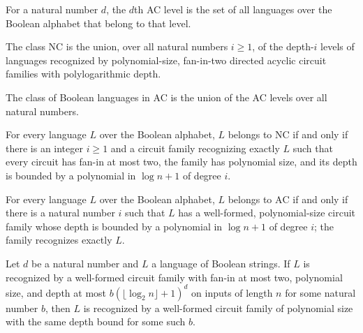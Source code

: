 \begin{definition}
\label{BoolCircuit.ACLevel}
\leanok
{}
For a natural number $d$, the $d$th AC level is the set of all languages over the
Boolean alphabet that belong to that level.
\end{definition}

\begin{definition}
\label{BoolCircuit.NC}
\leanok
{}
The class $\mathrm{NC}$ is the union, over all natural numbers $i\ge 1$, of the
depth-$i$ levels of languages recognized by polynomial-size, fan-in-two directed acyclic
circuit families with polylogarithmic depth.
\end{definition}

\begin{definition}
\label{BoolCircuit.AC}
\leanok
{}
The class of Boolean languages in AC is the union of the AC levels over all natural
numbers.
\end{definition}

\begin{theorem}[Characterization of NC]
\label{BoolCircuit.mem_NC_iff}
\leanok
{}
For every language $L$ over the Boolean alphabet, $L$ belongs to $\mathrm{NC}$ if and
only if there is an integer $i\ge 1$ and a circuit family recognizing exactly $L$ such
that every circuit has fan-in at most two, the family has polynomial size, and its depth
is bounded by a polynomial in $\log n+1$ of degree $i$.
\end{theorem}

\begin{theorem}[Characterization of AC]
\label{BoolCircuit.mem_AC_iff}
\leanok
{}
For every language $L$ over the Boolean alphabet, $L$ belongs to $\mathrm{AC}$ if and
only if there is a natural number $i$ such that $L$ has a well-formed, polynomial-size
circuit family whose depth is bounded by a polynomial in $\log n+1$ of degree $i$; the
family recognizes exactly $L$.
\end{theorem}

\begin{theorem}
\label{Language.InNC.inAC}
\leanok
{}
Let $d$ be a natural number and $L$ a language of Boolean strings. If $L$ is recognized
by a well-formed circuit family with fan-in at most two, polynomial size, and depth at
most $b(\lfloor\log_2 n\rfloor+1)^d$ on inputs of length $n$ for some natural number
$b$, then $L$ is recognized by a well-formed circuit family of polynomial size with the
same depth bound for some such $b$.
\end{theorem}

